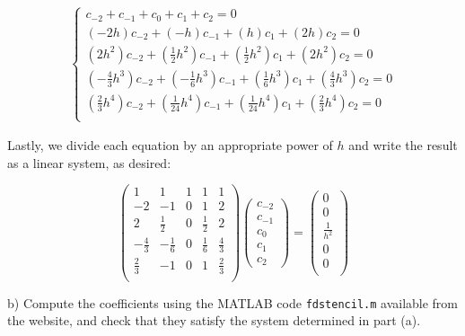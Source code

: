 \begin{solution}
    \begin{align*}
    \begin{cases}
        c_{-2} + c_{-1} + c_0 + c_1 + c_2 = 0 \\
        (-2h)c_{-2} + (-h)c_{-1} + (h)c_1 + (2h)c_2 = 0 \\
        (2h^2)c_{-2} + (\frac{1}{2}h^2)c_{-1} + (\frac{1}{2}h^2)c_1 + (2h^2)c_2 = 0 \\
        (-\frac{4}{3}h^3)c_{-2} + (-\frac{1}{6}h^3)c_{-1} + (\frac{1}{6}h^3)c_1 + (\frac{4}{3}h^3)c_2 = 0 \\
        (\frac{2}{3}h^4)c_{-2} + (\frac{1}{24}h^4)c_{-1} + (\frac{1}{24}h^4)c_1 + (\frac{2}{3}h^4)c_2 = 0 \\
    \end{cases}
    \end{align*}

    Lastly, we divide each equation by an appropriate power of $h$ and write the result as a linear system, as desired:

    $$
    \begin{pmatrix}
        1            &           1  & 1 &           1 & 1 \\
        -2           &           -1 & 0 &           1 & 2 \\
        2            & \frac{1}{2}  & 0 & \frac{1}{2} & 2 \\
        -\frac{4}{3} & -\frac{1}{6} & 0 & \frac{1}{6} & \frac{4}{3} \\
        \frac{2}{3}  &           -1 & 0 & 1           & \frac{2}{3} \\
    \end{pmatrix}
    \begin{pmatrix}
        c_{-2} \\ c_{-1} \\ c_0 \\ c_1 \\ c_2
    \end{pmatrix}
        =
    \begin{pmatrix}
        0 \\
        0 \\
        \frac{1}{h^2} \\ 
        0 \\
        0 \\
    \end{pmatrix}
    $$
\end{solution}


b)  Compute the coefficients using the MATLAB code \texttt{fdstencil.m} available from the website, and check that they
  satisfy the system determined in part (a).


